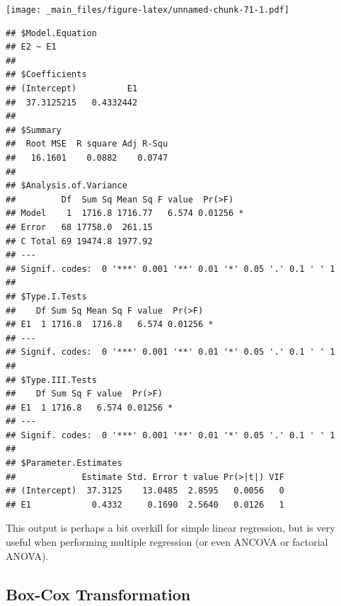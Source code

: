 \documentclass[
]{book}
\newenvironment{Shaded}{\begin{snugshade}}{\end{snugshade}}
\newcommand{\AttributeTok}[1]{\textcolor[rgb]{0.77,0.63,0.00}{#1}}
\newcommand{\DecValTok}[1]{\textcolor[rgb]{0.00,0.00,0.81}{#1}}
\newcommand{\FunctionTok}[1]{\textcolor[rgb]{0.00,0.00,0.00}{#1}}
\newcommand{\NormalTok}[1]{#1}
\newcommand{\SpecialCharTok}[1]{\textcolor[rgb]{0.00,0.00,0.00}{#1}}
\begin{document}
\begin{Shaded}
\end{Shaded}

\texttt{[image: \_main\_files/figure-latex/unnamed-chunk-71-1.pdf]}

\begin{verbatim}
## $Model.Equation
## E2 ~ E1
## 
## $Coefficients
## (Intercept)          E1 
##  37.3125215   0.4332442 
## 
## $Summary
##  Root MSE  R square Adj R-Squ 
##   16.1601    0.0882    0.0747 
## 
## $Analysis.of.Variance
##         Df  Sum Sq Mean Sq F value  Pr(>F)  
## Model    1  1716.8 1716.77   6.574 0.01256 *
## Error   68 17758.0  261.15                  
## C Total 69 19474.8 1977.92                  
## ---
## Signif. codes:  0 '***' 0.001 '**' 0.01 '*' 0.05 '.' 0.1 ' ' 1
## 
## $Type.I.Tests
##    Df Sum Sq Mean Sq F value  Pr(>F)  
## E1  1 1716.8  1716.8   6.574 0.01256 *
## ---
## Signif. codes:  0 '***' 0.001 '**' 0.01 '*' 0.05 '.' 0.1 ' ' 1
## 
## $Type.III.Tests
##    Df Sum Sq F value  Pr(>F)  
## E1  1 1716.8   6.574 0.01256 *
## ---
## Signif. codes:  0 '***' 0.001 '**' 0.01 '*' 0.05 '.' 0.1 ' ' 1
## 
## $Parameter.Estimates
##             Estimate Std. Error t value Pr(>|t|) VIF
## (Intercept)  37.3125    13.0485  2.8595   0.0056   0
## E1            0.4332     0.1690  2.5640   0.0126   1
\end{verbatim}

This output is perhaps a bit overkill for simple linear regression, but is very useful when performing multiple regression (or even ANCOVA or factorial ANOVA).

\hypertarget{box-cox-transformation}{%
\subsection{Box-Cox Transformation}\label{box-cox-transformation}}
\end{document}
